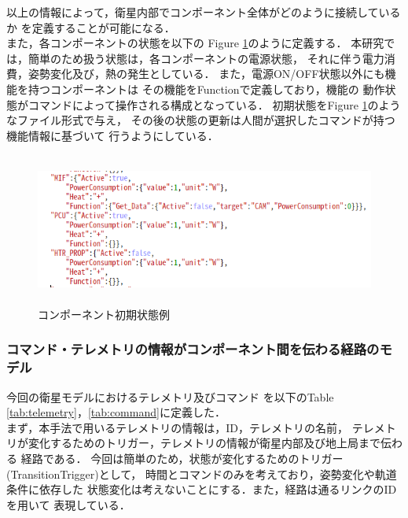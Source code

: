 \documentclass[11pt]{article}
\begin{document}
以上の情報によって，衛星内部でコンポーネント全体がどのように接続しているか
を定義することが可能になる．\\
また，各コンポーネントの状態を以下の
Figure \ref{fig:Compo_state}のように定義する．
本研究では，簡単のため扱う状態は，各コンポーネントの電源状態，
それに伴う電力消費，姿勢変化及び，熱の発生としている．
また，電源ON/OFF状態以外にも機能を持つコンポーネントは
その機能をFunctionで定義しており，機能の
動作状態がコマンドによって操作される構成となっている．
初期状態をFigure \ref{fig:Compo_state}のようなファイル形式で与え，
その後の状態の更新は人間が選択したコマンドが持つ機能情報に基づいて
行うようにしている．
\begin{figure}[H]
   \centering
      \includegraphics[height=5.0cm]{figure/Component_state.png}
      \caption{コンポーネント初期状態例}
      \label{fig:Compo_state}
\end{figure}

\subsubsection{コマンド・テレメトリの情報がコンポーネント間を伝わる経路のモデル}
今回の衛星モデルにおけるテレメトリ及びコマンド
を以下のTable \ref{tab:telemetry}，\ref{tab:command}に定義した．\\
まず，本手法で用いるテレメトリの情報は，ID，テレメトリの名前，
テレメトリが変化するためのトリガー，テレメトリの情報が衛星内部及び地上局まで伝わる
経路である．
今回は簡単のため，状態が変化するためのトリガー(TransitionTrigger)として，
時間とコマンドのみを考えており，姿勢変化や軌道条件に依存した
状態変化は考えないことにする．また，経路は通るリンクのIDを用いて
表現している．
\end{document}
